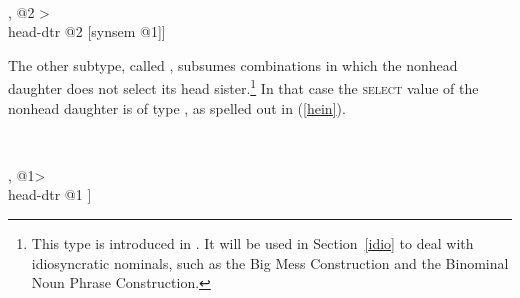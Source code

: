 \documentclass[output=paper
                ,modfonts
                ,nonflat
	        ,collection
	        ,collectionchapter
	        ,collectiontoclongg
 	        ,biblatex
                ,babelshorthands
                ,newtxmath
                ,draftmode
                ,colorlinks, citecolor=brown
]{./langsci/langscibook}
\begin{document}
\begin{exe}
\ex\label{hefu} 
 ~ \impl ~ 
\begin{avm}
[dtrs <[synsem|loc|category|head|select @1], @2 > \\
 head-dtr @2 [synsem @1]]
\end{avm}
\end{exe} 

\noindent
The other subtype, called , subsumes combinations in 
which the nonhead daughter does not select its head sister.\footnote{This type is 
introduced in \citet[130]{VanEynde98a}. It will be used in Section~\ref{idio} to deal with 
idiosyncratic nominals, such as the Big Mess Construction and the Binominal Noun Phrase 
Construction.} In that case the \textsc{select} value of the nonhead daughter is of type 
, as spelled out in (\ref{hein}). 

\begin{exe}
\ex\label{hein} 
 ~ \impl ~\\
\begin{avm}
[dtrs <[synsem|loc|category|head|select \type{none}], @1> \\
 head-dtr @1 ]
\end{avm}
\end{exe}    
\end{document}
